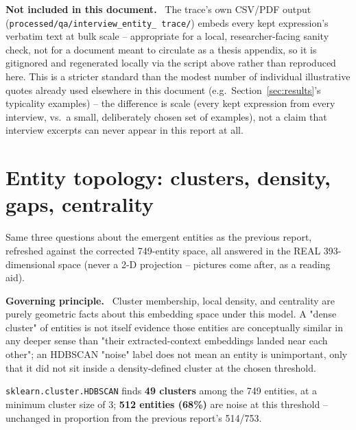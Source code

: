 \documentclass[11pt,a4paper]{article}
\newenvironment{plainbox}[1][Note]
  {\par\vspace{6pt}\noindent{\color{noteline}\rule{\linewidth}{0.6pt}}\par\vspace{3pt}
   \noindent\small\textbf{#1.}\ \ignorespaces}
  {\par\vspace{3pt}\noindent{\color{noteline}\rule{\linewidth}{0.6pt}}\vspace{6pt}\par}
\begin{document}
\begin{plainbox}[Not included in this document]
The trace's own CSV/PDF output (\texttt{processed/qa/interview\_entity\_
trace/}) embeds every kept expression's verbatim text at bulk scale --
appropriate for a local, researcher-facing sanity check, not for a
document meant to circulate as a thesis appendix, so it is gitignored
and regenerated locally via the script above rather than reproduced
here. This is a stricter standard than the modest number of individual
illustrative quotes already used elsewhere in this document (e.g.\
Section~\ref{sec:results}'s typicality examples) -- the difference is
scale (every kept expression from every interview, vs.\ a small,
deliberately chosen set of examples), not a claim that interview
excerpts can never appear in this report at all.
\end{plainbox}

\section{Entity topology: clusters, density, gaps, centrality}
\label{sec:topology}

Same three questions about the emergent entities as the previous
report, refreshed against the corrected 749-entity space, all answered
in the REAL 393-dimensional space (never a 2-D projection -- pictures
come after, as a reading aid).

\begin{plainbox}[Governing principle]
Cluster membership, local density, and centrality are purely geometric
facts about this embedding space under this model. A "dense cluster" of
entities is not itself evidence those entities are conceptually similar
in any deeper sense than "their extracted-context embeddings landed near
each other"; an HDBSCAN "noise" label does not mean an entity is
unimportant, only that it did not sit inside a density-defined cluster
at the chosen threshold.
\end{plainbox}

\texttt{sklearn.cluster.HDBSCAN} finds \textbf{49 clusters} among the
749 entities, at a minimum cluster size of 3; \textbf{512 entities
(68\%)} are noise at this threshold -- unchanged in proportion from the
previous report's 514/753.
\end{document}
